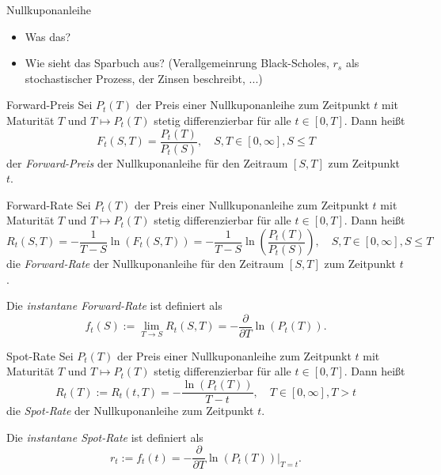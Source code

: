 \begin{info}{Nullkuponanleihe}
    \begin{itemize}
        \item Was das?
        \item Wie sieht das Sparbuch aus? (Verallgemeinrung Black-Scholes, $r_s$ als stochastischer Prozess, der Zinsen beschreibt, ...)
    \end{itemize}
\end{info}

\begin{defi}[Nullkuponanleihe]{Forward-Preis}
    Sei $P_t(T)$ der Preis einer Nullkuponanleihe zum Zeitpunkt $t$ mit Maturität $T$ und $T \mapsto P_t(T)$ stetig differenzierbar für alle $t \in [0, T]$.
    Dann heißt
    \[
        F_t(S, T) = \frac{P_t(T)}{P_t(S)}, \quad S, T \in [0, \infty], S \leq T
    \]
    der \emph{Forward-Preis} der Nullkuponanleihe für den Zeitraum $[S, T]$ zum Zeitpunkt $t$.
\end{defi}

\begin{defi}[Nullkuponanleihe]{Forward-Rate}
    Sei $P_t(T)$ der Preis einer Nullkuponanleihe zum Zeitpunkt $t$ mit Maturität $T$ und $T \mapsto P_t(T)$ stetig differenzierbar für alle $t \in [0, T]$.
    Dann heißt
    \[
        R_t(S, T) = -\frac{1}{T-S} \ln(F_t(S, T)) = -\frac{1}{T-S} \ln\left(\frac{P_t(T)}{P_t(S)}\right), \quad S, T \in [0, \infty], S \leq T
    \]
    die \emph{Forward-Rate} der Nullkuponanleihe für den Zeitraum $[S, T]$ zum Zeitpunkt $t$.

    Die \emph{instantane Forward-Rate} ist definiert als
    \[
        f_t(S) := \lim_{T \to S} R_t(S, T) = -\frac{\partial}{\partial T} \ln(P_t(T)).
    \]
\end{defi}

\begin{defi}[Nullkuponanleihe]{Spot-Rate}
    Sei $P_t(T)$ der Preis einer Nullkuponanleihe zum Zeitpunkt $t$ mit Maturität $T$ und $T \mapsto P_t(T)$ stetig differenzierbar für alle $t \in [0, T]$.
    Dann heißt
    \[
        R_t(T) := R_t(t, T) = -\frac{\ln(P_t(T))}{T-t}, \quad T \in [0, \infty], T > t
    \]
    die \emph{Spot-Rate} der Nullkuponanleihe zum Zeitpunkt $t$.

    Die \emph{instantane Spot-Rate} ist definiert als
    \[
        r_t := f_t(t) = -\frac{\partial}{\partial T} \ln(P_t(T)) \big|_{T=t}.
    \]
\end{defi}


